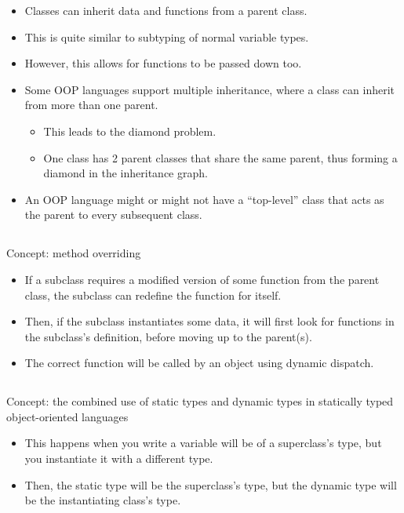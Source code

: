\begin{itemize}[noitemsep]
\item Classes can inherit data and functions from a parent class.
\item This is quite similar to subtyping of normal variable types.
\item However, this allows for functions to be passed down too.
\item Some OOP languages support multiple inheritance, where a class can inherit from more than one parent.
  \begin{itemize}[noitemsep]
  \item This leads to the diamond problem.
  \item One class has 2 parent classes that share the same parent, thus forming a diamond in the inheritance graph.
  \end{itemize}
\item An OOP language might or might not have a ``top-level'' class that acts as the parent to every subsequent class.
\end{itemize}

\subsection{}
Concept: method overriding

\begin{itemize}[noitemsep]
\item If a subclass requires a modified version of some function from the parent class, the subclass can redefine the function for itself.
\item Then, if the subclass instantiates some data, it will first look for functions in the subclass's definition, before moving up to the parent(s).
\item The correct function will be called by an object using dynamic dispatch.
\end{itemize}

\subsection{}
Concept: the combined use of static types and dynamic types in statically typed object-oriented languages

\begin{itemize}[noitemsep]
\item This happens when you write a variable will be of a superclass's type, but you instantiate it with a different type.
\item Then, the static type will be the superclass's type, but the dynamic type will be the instantiating class's type.
\end{itemize}

